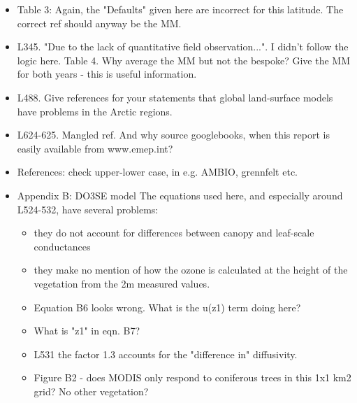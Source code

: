 \documentclass{scrartcl}
\begin{document}
\begin{itemize}
\item {\color{blue}Table 3: Again, the "Defaults" given here are incorrect for this latitude. The correct ref should anyway be the MM.}

\item {\color{blue}L345. "Due to the lack of quantitative field observation...". I didn't follow the logic here. Table 4. Why average the MM but not the bespoke? Give the MM for both years - this is useful information.}

\item {\color{blue}L488. Give references for your statements that global land-surface models have problems in the Arctic regions.}

\item {\color{blue}L624-625. Mangled ref. And why source googlebooks, when this report is easily available from www.emep.int?}

\item {\color{blue}References: check upper-lower case, in e.g. AMBIO, grennfelt etc.}
 
\item {\color{blue}Appendix B: DO3SE model
The equations used here, and especially around L524-532, have several problems:
\begin{itemize}
\item they do not account for differences between canopy and leaf-scale conductances
\item they make no mention of how the ozone is calculated at the height of the vegetation from the 2m measured values.
\item Equation B6 looks wrong. What is the u(z1) term doing here?
\item What is "z1" in eqn. B7?
\item L531 the factor 1.3 accounts for the "difference in" diffusivity.
\item Figure B2 - does MODIS only respond to coniferous trees in this 1x1 km2 grid? No other vegetation?
\end{itemize}}
  

\end{itemize}
\end{document}

